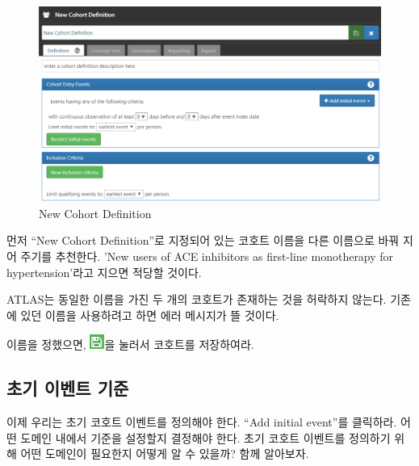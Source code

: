 \documentclass[11pt]{book}
\theoremstyle{definition}
\theoremstyle{definition}
\theoremstyle{definition}
\theoremstyle{remark}
\let\BeginKnitrBlock\begin \let\EndKnitrBlock\end
\begin{document}
\begin{figure}

{\centering \includegraphics[width=1\linewidth]{images/Cohorts/ATLAS-defineacohort} 

}

\caption{New Cohort Definition}\label{fig:ATLASdefineacohort}
\end{figure}

먼저 ``New Cohort Definition''로 지정되어 있는 코호트 이름을 다른
이름으로 바꿔 지어 주기를 추천한다. 'New users of ACE inhibitors as
first-line monotherapy for hypertension'라고 지으면 적당할 것이다.

\BeginKnitrBlock{rmdimportant}
ATLAS는 동일한 이름을 가진 두 개의 코호트가 존재하는 것을 허락하지
않는다. 기존에 있던 이름을 사용하려고 하면 에러 메시지가 뜰 것이다.
\EndKnitrBlock{rmdimportant}

이름을 정했으면, \includegraphics{images/Cohorts/save.png}을 눌러서
코호트를 저장하여라.

\subsection{초기 이벤트 기준}\label{--}

이제 우리는 초기 코호트 이벤트를 정의해야 한다. ``Add initial event''를
클릭하라. 어떤 도메인 내에서 기준을 설정할지 결정해야 한다. 초기 코호트
이벤트를 정의하기 위해 어떤 도메인이 필요한지 어떻게 알 수 있을까? 함께
알아보자.
\end{document}

